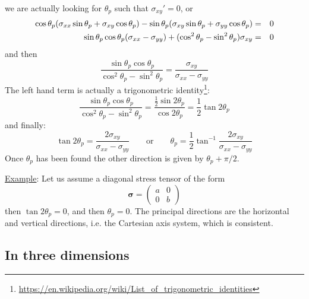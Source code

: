 we are actually looking for $\theta_p$ such that $\sigma_{xy}'=0$, or
\begin{eqnarray}
\cos\theta_p(\sigma_{xx} \sin\theta_p + \sigma_{xy} \cos\theta_p )-
\sin\theta_p(\sigma_{xy} \sin\theta_p + \sigma_{yy} \cos\theta_p ) &=& 0 \nonumber\\
\sin\theta_p \cos\theta_p (\sigma_{xx}-\sigma_{yy}) + ( \cos^2\theta_p -\sin^2\theta_p )\sigma_{xy} &=& 0 \nonumber 
\end{eqnarray}
and then 
\[
\frac{ \sin\theta_p \cos\theta_p}{ \cos^2\theta_p -\sin^2\theta_p }
= \frac{\sigma_{xy}}{ \sigma_{xx}-\sigma_{yy} }
\]
The left hand term is actually a trigonometric 
identity\footnote{\url{https://en.wikipedia.org/wiki/List_of_trigonometric_identities}}:
\[
\frac{ \sin\theta_p \cos\theta_p}{ \cos^2\theta_p -\sin^2\theta_p } 
= \frac{\frac12 \sin 2\theta_p}{\cos 2\theta_p}
= \frac{1}{2} \tan 2\theta_p
\]
and finally:
\[
\tan 2\theta_p = \frac{ 2\sigma_{xy}}{ \sigma_{xx}-\sigma_{yy} }
\qquad
\text{or}
\qquad
\boxed{
\theta_p = \frac{1}{2} \tan^{-1} \frac{ 2\sigma_{xy}}{ \sigma_{xx}-\sigma_{yy} }
}
\]
Once $\theta_p$ has been found the other direction is given by $\theta_p +\pi/2$.

\vspace{.5cm}

\noindent \underline{Example}: Let us assume a diagonal stress tensor of the form 
\[
{\bm \sigma} = 
\left(
\begin{array}{cc}
a & 0 \\
0 & b
\end{array}
\right)
\]
then $\tan 2\theta_p = 0$, and then $\theta_p=0$. The principal directions are the horizontal and 
vertical directions, i.e. the Cartesian axis system, which is consistent.




\subsection{In three dimensions}

